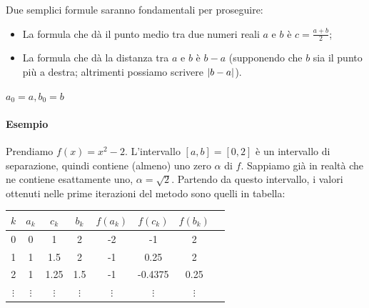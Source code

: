 \documentclass[a4paper]{report}
\DeclarePairedDelimiter{\abs}{\lvert}{\rvert}
\theoremstyle{definition}
\theoremstyle{remark}
\begin{document}
Due semplici formule saranno fondamentali per proseguire:
\begin{itemize}
    \item La formula che dà il punto medio tra due numeri reali $a$ e $b$ è $c = \frac{a+b}{2}$;
    \item La formula che dà la distanza tra $a$ e $b$ è $b-a$ (supponendo che $b$ sia il punto più a destra; altrimenti possiamo scrivere $\abs{b-a}$).
\end{itemize}
\begin{center}
\end{center}

\begin{algorithm}
$a_0=a,b_0=b$\;
\caption{Il metodo di bisezione}
\end{algorithm}

\paragraph{Esempio} Prendiamo $f(x) = x^2 - 2$. L'intervallo $[a,b] = [0,2]$ è un intervallo di separazione, quindi contiene (almeno) uno zero $\alpha$ di $f$. Sappiamo già in realtà che ne contiene esattamente uno, $\alpha=\sqrt{2}$. Partendo da questo intervallo, i valori ottenuti nelle prime iterazioni del metodo sono quelli in tabella:

\begin{center}
    \begin{tabular}{cccccccc}
        \toprule
        $k$ & $a_k$ & $c_k$ & $b_k$ & $f(a_k)$ & $f(c_k)$ & $f(b_k)$\\
        \midrule
        0 & 0 & 1 & 2 & -2 & -1 & 2\\
        1 & 1 & 1.5 & 2 & -1 & 0.25 & 2\\
        2 & 1 & 1.25 & 1.5 & -1 & -0.4375 & 0.25\\
        $\vdots$ & $\vdots$ & $\vdots$ & $\vdots$ & $\vdots$ & $\vdots$ &$\vdots$ \\
        \bottomrule
    \end{tabular}
\end{center}
\end{document}
